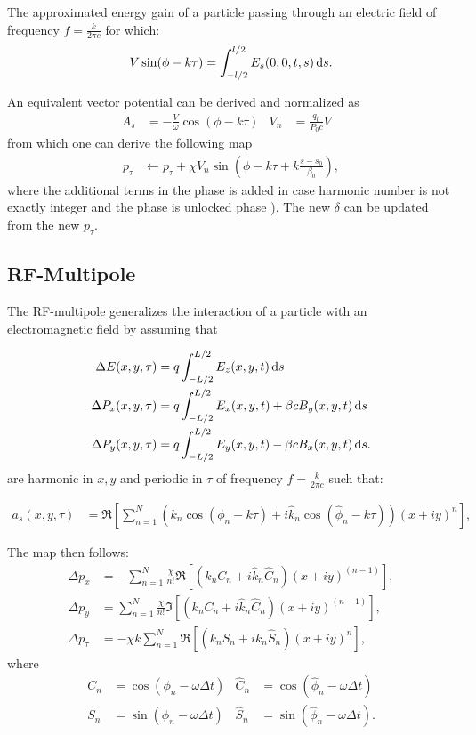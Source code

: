 The approximated energy gain of a particle passing through an electric field of frequency $f=\frac{k}{2\pi c}$ for which:
\begin{align}
V \sin(\phi - k \tau) = \int_{-l/2}^{l/2} E_s(0,0,t,s)  {\rm \,d}s.
\end{align}

An equivalent vector potential can be derived and normalized as
\begin{align}
A_s& = - \frac{V}{\omega} \cos(\phi - k \tau ) & 
V_n&=  \frac{q_0}{P_0 c} V  & 
\end{align}
from which one can derive the following map
\begin{align}
p_\tau & \leftarrow p_\tau + \chi V_n \sin(\phi - k \tau + k \frac{s-s_0}{\beta_0}  ),
\end{align}
where the additional terms in the phase is added in case harmonic number is not exactly
integer and the phase is unlocked phase ). The new $\delta$ can be updated from the new $p_\tau$.



\subsection{RF-Multipole}

The RF-multipole generalizes the interaction of a particle with an electromagnetic field by assuming that

\begin{align}
\Delta E(x,y,\tau) &= q \int_{-L/2}^{L/2} E_z(x,y,t)  {\rm \,d}s \\
\Delta P_x(x,y,\tau) &= q \int_{-L/2}^{L/2} E_x(x,y,t) + \beta c B_y(x,y,t) {\rm \,d}s\\
\Delta P_y(x,y,\tau) &= q \int_{-L/2}^{L/2} E_y(x,y,t) - \beta c B_x(x,y,t) {\rm \,d}s.
\end{align}
are harmonic in $x,y$ and periodic in $\tau$ of frequency $f=\frac{k}{2\pi c}$ such that:

\begin{align}
a_s(x,y,\tau) 
&= \Re \left[ \sum_{n=1}^N
      \left(       k_n \cos(\phi_n -k \tau ) +
            i \hat k_n \cos(\hat \phi_n -k \tau)
      \right)    
      (x+i y )^n
     \right],
\end{align}

The map then follows:
\begin{align}
    \Delta p_x &= -\sum_{n=1}^N \frac{\chi}{n!} \Re\left[ (k_n C_n + i \hat k_n \hat C_n)(x+iy)^{(n-1)}\right], \\
    \Delta p_y &=  \sum_{n=1}^N \frac{\chi}{n!} \Im\left[ (k_n C_n + i \hat k_n \hat C_n)(x+iy)^{(n-1)}\right], \\
    \Delta p_\tau &= -\chi k \sum_{n=1}^N \Re\left[( k_n S_n + i k_n \hat S_n ) (x+iy)^n\right],
\end{align}
where
\begin{align}
     C_n&=\cos(\phi_n-\omega \Delta t) &
\hat C_n&=\cos(\hat \phi_n-\omega \Delta t) \\
     S_n&=\sin(\phi_n-\omega \Delta t) &
\hat S_n&=\sin(\hat \phi_n-\omega \Delta t) .
\end{align}



